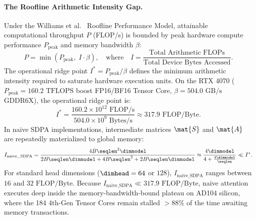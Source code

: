 \paragraph{The Roofline Arithmetic Intensity Gap.}
Under the Williams et al.~\cite{williams2009roofline} Roofline Performance Model, attainable computational throughput $P$ (FLOP/s) is bounded by peak hardware compute performance $P_{\text{peak}}$ and memory bandwidth $\beta$:
\begin{equation}
P = \min\left( P_{\text{peak}}, \; I \cdot \beta \right), \quad \text{where} \quad I = \frac{\text{Total Arithmetic FLOPs}}{\text{Total Device Bytes Accessed}}.
\label{eq:roofline_formulation}
\end{equation}
The operational ridge point $I^* = P_{\text{peak}} / \beta$ defines the minimum arithmetic intensity required to saturate hardware execution units. On the RTX 4070 ($P_{\text{peak}} = 160.2\text{ TFLOPS}$ boost FP16/BF16 Tensor Core, $\beta = 504.0\text{ GB/s}$ GDDR6X), the operational ridge point is:
\begin{equation}
I^* = \frac{160.2 \times 10^{12}\text{ FLOP/s}}{504.0 \times 10^9\text{ Bytes/s}} \approx 317.9\text{ FLOP/Byte}.
\label{eq:rtx4070_ridge_point}
\end{equation}
In naive SDPA implementations, intermediate matrices $\mat{S}$ and $\mat{A}$ are repeatedly materialized to global memory:
\begin{equation}
I_{\text{naive\_SDPA}} = \frac{4 B \seqlen^2 \dimmodel}{2 B \seqlen \dimmodel + 4 B \seqlen^2 + 2 B \seqlen \dimmodel} \approx \frac{4 \dimmodel}{4 + \frac{4\dimmodel}{\seqlen}} \ll I^*.
\end{equation}
For standard head dimensions ($\dimhead = 64$ or $128$), $I_{\text{naive\_SDPA}}$ ranges between $16$ and $32\text{ FLOP/Byte}$. Because $I_{\text{naive\_SDPA}} \ll 317.9\text{ FLOP/Byte}$, naive attention executes deep inside the memory-bandwidth-bound plateau on AD104 silicon, where the 184 4th-Gen Tensor Cores remain stalled $>88\%$ of the time awaiting memory transactions.

